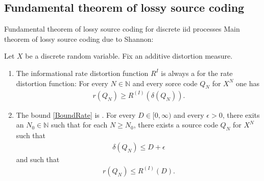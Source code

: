 \subsection{Fundamental theorem of lossy source coding}
\begin{frame}{Fundamental theorem of lossy source coding for discrete iid processes}
Main theorem of lossy source coding due to Shannon: 
\begin{theorem}
Let $X$ be a discrete random variable. Fix an additive distortion measure. 
\begin{enumerate}
\item The informational rate distortion function $R^{I}$ is always a  for the rate distortion function: 
For every $N\in\mathbb{N}$ and every sorce code $Q_N$ for $X^N$ one has  
\begin{align}\label{BoundRate}
r(Q_N)\geq R^{(I)}(\delta(Q_N)). 
\end{align}
\item The bound \eqref{BoundRate} is . For every $D\in[0,\infty)$ and every $\epsilon>0$, there exits an $N_0\in\mathbb{N}$ such that for each $N\geq N_0$, there 
exists a source code $Q_N$ for $X^N$ such that 
\begin{align*}
\delta(Q_N)\leq D+\epsilon
\end{align*}
and such that
\begin{align*}
r(Q_{N})\leq R^{(I)}(D). 
\end{align*}
\end{enumerate}
\end{theorem}
\end{frame}

